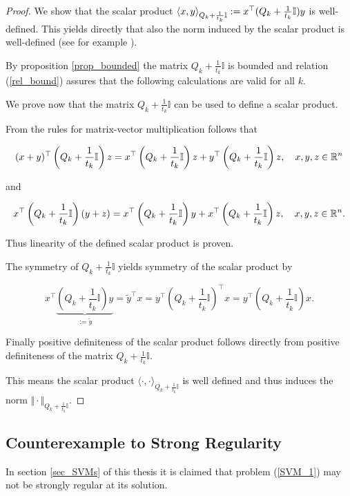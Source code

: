 \begin{proof}
	We show that the scalar product \(\left\langle x,y \right\rangle_{Q_k+\frac{1}{t_k}\mathbb{I}} := x^{\top} (Q_k+\frac{1}{t_k}\mathbb{I})y\) is well-defined.
	This yields directly that also the norm induced by the scalar product is well-defined (see for example \cite[Corollary 12.6, p. 172]{Liesen2015}).
	
	By proposition \ref{prop_bounded} the matrix \(Q_k+\frac{1}{t_k}\mathbb{I}\) is bounded and relation (\ref{rel_bound}) assures that the following calculations are valid for all \(k\).
	
	We prove now that the matrix \(Q_k+\frac{1}{t_k}\mathbb{I}\) can be used to define a scalar product.
	
From the rules for matrix-vector multiplication follows that

\[ (x+y)^{\top}\left(Q_k+\frac{1}{t_k}\mathbb{I}\right)z = x^{\top}\left(Q_k+\frac{1}{t_k}\mathbb{I}\right)z + y^{\top}\left(Q_k+\frac{1}{t_k}\mathbb{I}\right)z, \quad x,y,z \in \mathbb{R}^n\]

and 

\[ x^{\top}\left(Q_k+\frac{1}{t_k}\mathbb{I}\right)(y+z) = x^{\top}\left(Q_k+\frac{1}{t_k}\mathbb{I}\right)y + x^{\top}\left(Q_k+\frac{1}{t_k}\mathbb{I}\right)z, \quad x,y,z \in \mathbb{R}^n.\]

Thus linearity of the defined scalar product is proven.

The symmetry of \(Q_k+\frac{1}{t_k}\mathbb{I}\) yields symmetry of the scalar product by

\[ x^{\top} \underbrace{\left(Q_k+\frac{1}{t_k}\mathbb{I}\right)y}_{:=\tilde{y}} = \tilde{y}^{\top}x = y^{\top}\left(Q_k+\frac{1}{t_k}\mathbb{I}\right)^{\top}x = y^{\top}\left(Q_k+\frac{1}{t_k}\mathbb{I}\right)x.   \]

Finally positive definiteness of the scalar product follows directly from positive definiteness of the matrix \(Q_k+\frac{1}{t_k}\mathbb{I}\).

This means the scalar product \(\langle \cdot,\cdot \rangle_{Q_k+\frac{1}{t_k}\mathbb{I}}\) is well defined and thus induces the norm \(\Vert \cdot \Vert_{Q_k+\frac{1}{t_k}\mathbb{I}}\).
\end{proof}

\subsection{Counterexample to Strong Regularity}
\label{sec_counter_ex}
In section \ref{sec_SVMs} of this thesis it is claimed that problem (\ref{SVM_1}) may not be strongly regular at its solution.

